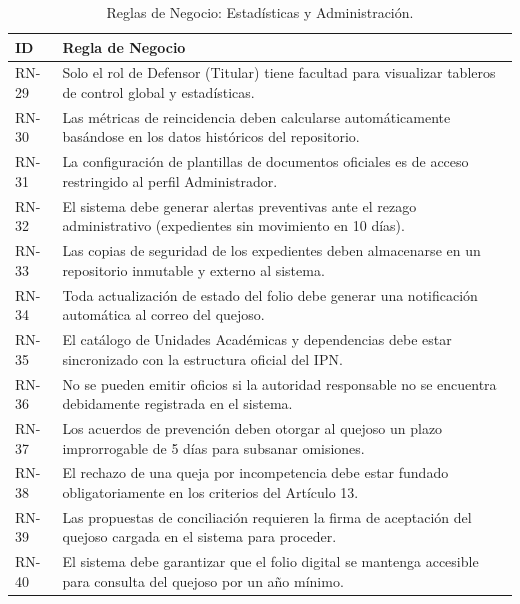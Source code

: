 \begin{table}[h!]
\centering
\scriptsize
\caption{Reglas de Negocio: Estadísticas y Administración.}
\label{tab:rn_admin}
\begin{tabular}{@{} l p{12cm} @{}}
\toprule
\rowcolor[HTML]{2D3E50} 
\textbf{\color[HTML]{FFFFFF} ID} & \textbf{\color[HTML]{FFFFFF} Regla de Negocio} \\ \midrule
RN-29 & Solo el rol de Defensor (Titular) tiene facultad para visualizar tableros de control global y estadísticas. \\
\rowcolor[HTML]{F2F4F7} 
RN-30 & Las métricas de reincidencia deben calcularse automáticamente basándose en los datos históricos del repositorio. \\
RN-31 & La configuración de plantillas de documentos oficiales es de acceso restringido al perfil Administrador. \\
\rowcolor[HTML]{F2F4F7} 
RN-32 & El sistema debe generar alertas preventivas ante el rezago administrativo (expedientes sin movimiento en 10 días). \\
RN-33 & Las copias de seguridad de los expedientes deben almacenarse en un repositorio inmutable y externo al sistema. \\
\rowcolor[HTML]{F2F4F7} 
RN-34 & Toda actualización de estado del folio debe generar una notificación automática al correo del quejoso. \\
RN-35 & El catálogo de Unidades Académicas y dependencias debe estar sincronizado con la estructura oficial del IPN. \\
\rowcolor[HTML]{F2F4F7} 
RN-36 & No se pueden emitir oficios si la autoridad responsable no se encuentra debidamente registrada en el sistema. \\
RN-37 & Los acuerdos de prevención deben otorgar al quejoso un plazo improrrogable de 5 días para subsanar omisiones. \\
\rowcolor[HTML]{F2F4F7} 
RN-38 & El rechazo de una queja por incompetencia debe estar fundado obligatoriamente en los criterios del Artículo 13. \\
RN-39 & Las propuestas de conciliación requieren la firma de aceptación del quejoso cargada en el sistema para proceder. \\
\rowcolor[HTML]{F2F4F7} 
RN-40 & El sistema debe garantizar que el folio digital se mantenga accesible para consulta del quejoso por un año mínimo. \\ \bottomrule
\end{tabular}
\end{table}